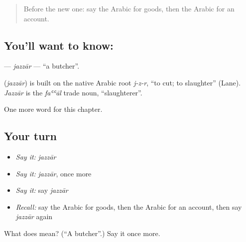 \label{lesson:AR-C220-jazzar}



\begin{quote}
Before the new one: say the Arabic for goods, then the Arabic for an account.
\end{quote}

\subsection*{You'll want to know: }
\textbf{} — \emph{jazzār} — \textquotedblleft{}a butcher\textquotedblright{}.

\begin{cousinweb}
\textbf{} (\emph{jazzār}) is built on the native Arabic root \emph{j-z-r}, \textquotedblleft{}to cut; to slaughter\textquotedblright{} (Lane). \emph{Jazzār} is the \emph{faʿʿāl} trade noun, \textquotedblleft{}slaughterer\textquotedblright{}.
\end{cousinweb}

\begin{grammarlens}[title={What you've built}]
One more word for this chapter.
\end{grammarlens}

\subsection*{Your turn}
\begin{itemize}
\raggedright
  \item \emph{Say it:} \emph{jazzār}
  \item \emph{Say it:} \emph{jazzār}, once more
  \item \emph{Say it:} say \emph{jazzār}
  \item \emph{Recall:} say the Arabic for goods, then the Arabic for an account, then say \emph{jazzār} again
\end{itemize}

\begin{tcolorbox}[breakable,colback=teal!4,colframe=teal!35!black,title={Before you move on}]
What does  mean? (\textquotedblleft{}A butcher\textquotedblright{}.) Say it once more.
\end{tcolorbox}
